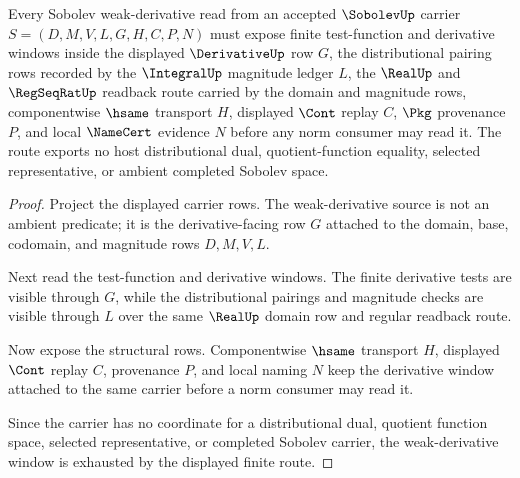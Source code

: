 \begin{theorem}
\label{thm:sobolev-weak-derivative-window-obligation}
Every Sobolev weak-derivative read from an accepted $\SobolevUp$ carrier $S=(D,M,V,L,G,H,C,P,N)$ must expose finite test-function and derivative windows inside the displayed $\DerivativeUp$ row $G$, the distributional pairing rows recorded by the $\IntegralUp$ magnitude ledger $L$, the $\RealUp$ and $\RegSeqRatUp$ readback route carried by the domain and magnitude rows, componentwise $\hsame$ transport $H$, displayed $\Cont$ replay $C$, $\Pkg$ provenance $P$, and local $\NameCert$ evidence $N$ before any norm consumer may read it. The route exports no host distributional dual, quotient-function equality, selected representative, or ambient completed Sobolev space.
\end{theorem}
\begin{proof}
Project the displayed carrier rows. The weak-derivative source is not an ambient predicate; it is the derivative-facing row $G$ attached to the domain, base, codomain, and magnitude rows $D,M,V,L$.

Next read the test-function and derivative windows. The finite derivative tests are visible through $G$, while the distributional pairings and magnitude checks are visible through $L$ over the same $\RealUp$ domain row and regular readback route.

Now expose the structural rows. Componentwise $\hsame$ transport $H$, displayed $\Cont$ replay $C$, provenance $P$, and local naming $N$ keep the derivative window attached to the same carrier before a norm consumer may read it.

Since the carrier has no coordinate for a distributional dual, quotient function space, selected representative, or completed Sobolev carrier, the weak-derivative window is exhausted by the displayed finite route.
\end{proof}

